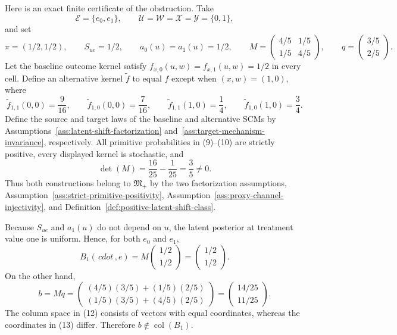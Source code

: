 Here is an exact finite certificate of the obstruction. Take
\[
\mathcal E=\{e_0,e_1\},
\qquad
\mathcal U=\mathcal W=\mathcal X=\mathcal Y=\{0,1\},
\]
and set
\[
\pi=(1/2,1/2),
\qquad
S_{ue}=1/2,
\qquad
a_0(u)=a_1(u)=1/2,
\qquad
M=\begin{pmatrix}4/5&1/5\\[2pt]1/5&4/5\end{pmatrix},
\qquad
q=\begin{pmatrix}3/5\\[2pt]2/5\end{pmatrix}.
\tag{9}
\]
Let the baseline outcome kernel satisfy \(f_{x,0}(u,w)=f_{x,1}(u,w)=1/2\) in every cell. Define an alternative kernel \(\widetilde f\) to equal \(f\) except when \((x,w)=(1,0)\), where
\[
\widetilde f_{1,1}(0,0)=\frac9{16},
\qquad
\widetilde f_{1,0}(0,0)=\frac7{16},
\qquad
\widetilde f_{1,1}(1,0)=\frac14,
\qquad
\widetilde f_{1,0}(1,0)=\frac34.
\tag{10}
\]
Define the source and target laws of the baseline and alternative SCMs by Assumptions~\ref{ass:latent-shift-factorization} and~\ref{ass:target-mechanism-invariance}, respectively. All primitive probabilities in (9)--(10) are strictly positive, every displayed kernel is stochastic, and
\[
\det(M)=\frac{16}{25}-\frac1{25}=\frac35\ne0.
\tag{11}
\]
Thus both constructions belong to \(\mathfrak M_{+}\) by the two factorization assumptions, Assumption~\ref{ass:strict-primitive-positivity}, Assumption~\ref{ass:proxy-channel-injectivity}, and Definition~\ref{def:positive-latent-shift-class}.

Because \(S_{ue}\) and \(a_1(u)\) do not depend on \(u\), the latent posterior at treatment value one is uniform. Hence, for both \(e_0\) and \(e_1\),
\[
B_1(\,cdot\,,e)
=M\begin{pmatrix}1/2\\[2pt]1/2\end{pmatrix}
=\begin{pmatrix}1/2\\[2pt]1/2\end{pmatrix}.
\tag{12}
\]
On the other hand,
\[
b=Mq
=\begin{pmatrix}
(4/5)(3/5)+(1/5)(2/5)\\[2pt]
(1/5)(3/5)+(4/5)(2/5)
\end{pmatrix}
=\begin{pmatrix}14/25\\[2pt]11/25\end{pmatrix}.
\tag{13}
\]
The column space in (12) consists of vectors with equal coordinates, whereas the coordinates in (13) differ. Therefore \(b\notin\operatorname{col}(B_1)\).

